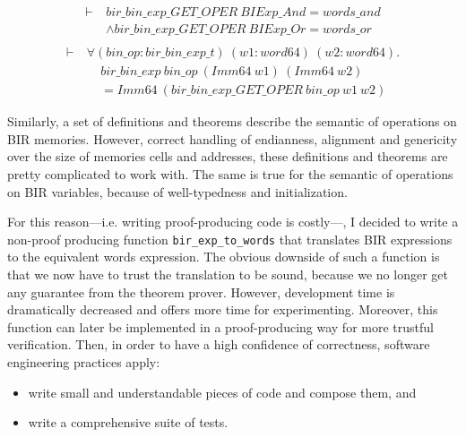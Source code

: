 \documentclass{kththesis}
\begin{document}
\begin{small}
    \begin{equation}
        \begin{split}
            \vdash~&bir\_bin\_exp\_GET\_OPER~BIExp\_And = words\_and\\
                   &\land bir\_bin\_exp\_GET\_OPER~BIExp\_Or = words\_or\\
        \end{split}
        \label{bir_bin_exp_GET_OPER_def}
    \end{equation}
    \begin{equation}
        \begin{split}
            \vdash~&\forall (bin\_op :bir\_bin\_exp\_t)~(w1 :word64)~(w2 :word64).\\
                   &~~~~~bir\_bin\_exp~bin\_op~(Imm64~w1)~(Imm64~w2)\\
                   &~~~~~= Imm64~(bir\_bin\_exp\_GET\_OPER~bin\_op~w1~w2)
        \end{split}
        \label{bir_bin_exp_def}
    \end{equation}
\end{small}

Similarly, a set of definitions and theorems describe the semantic of operations on BIR memories. However, correct handling of endianness, alignment and genericity over the size of memories cells and addresses, these definitions and theorems are pretty complicated to work with. The same is true for the semantic of operations on BIR variables, because of well-typedness and initialization.

For this reason---i.e. writing proof-producing code is costly---, I decided to write a non-proof producing function \texttt{bir\_exp\_to\_words} that translates BIR expressions to the equivalent words expression. The obvious downside of such a function is that we now have to trust the translation to be sound, because we no longer get any guarantee from the theorem prover. However, development time is dramatically decreased and offers more time for experimenting. Moreover, this function can later be implemented in a proof-producing way for more trustful verification. Then, in order to have a high confidence of correctness, software engineering practices apply:

\begin{itemize}
    \item write small and understandable pieces of code and compose them, and
    \item write a comprehensive suite of tests.
\end{itemize}
\end{document}
